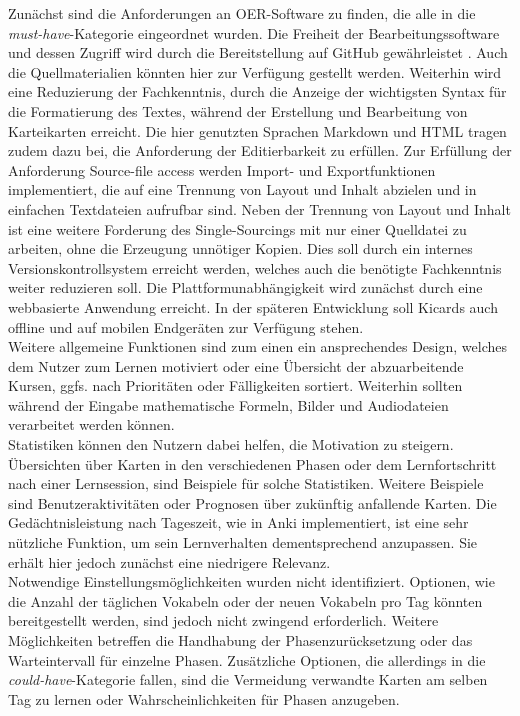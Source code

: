 \noindent Zunächst sind die Anforderungen an OER-Software zu finden, die alle in die \emph{must-have}-Kategorie eingeordnet wurden. 
Die Freiheit der Bearbeitungssoftware und dessen Zugriff wird durch die Bereitstellung auf GitHub gewährleistet \cite{kicards}. Auch die Quellmaterialien könnten hier zur Verfügung gestellt werden. 
Weiterhin wird eine Reduzierung der Fachkenntnis, durch die Anzeige der wichtigsten Syntax für die Formatierung des Textes, während der Erstellung und Bearbeitung von Karteikarten erreicht. Die hier genutzten Sprachen Markdown und HTML tragen zudem dazu bei, die Anforderung der Editierbarkeit zu erfüllen.
Zur Erfüllung der Anforderung \glqq Source-file access\grqq{} werden Import- und Exportfunktionen implementiert, die auf eine Trennung von Layout und Inhalt abzielen und in einfachen Textdateien aufrufbar sind. 
Neben der Trennung von Layout und Inhalt ist eine weitere Forderung des Single-Sourcings mit nur einer Quelldatei zu arbeiten, ohne die Erzeugung unnötiger Kopien. Dies soll durch ein internes Versionskontrollsystem erreicht werden, welches auch die benötigte Fachkenntnis weiter reduzieren soll. 
Die Plattformunabhängigkeit wird zunächst durch eine webbasierte Anwendung erreicht. In der späteren Entwicklung soll Kicards auch offline und auf mobilen Endgeräten zur Verfügung stehen. \\

\noindent Weitere allgemeine Funktionen sind zum einen ein ansprechendes Design, welches dem Nutzer zum Lernen motiviert oder eine Übersicht der abzuarbeitende Kursen, ggfs. nach Prioritäten oder Fälligkeiten sortiert. Weiterhin sollten während der Eingabe mathematische Formeln, Bilder und Audiodateien verarbeitet werden können. \\

\noindent Statistiken können den Nutzern dabei helfen, die Motivation zu steigern. Übersichten über Karten in den verschiedenen Phasen oder dem Lernfortschritt nach einer Lernsession, sind Beispiele für solche Statistiken. Weitere Beispiele sind Benutzeraktivitäten oder Prognosen über zukünftig anfallende Karten. Die Gedächtnisleistung nach Tageszeit, wie in Anki implementiert, ist eine sehr nützliche Funktion, um sein Lernverhalten dementsprechend anzupassen. Sie erhält hier jedoch zunächst eine niedrigere Relevanz. \\

\noindent Notwendige Einstellungsmöglichkeiten wurden nicht identifiziert. Optionen, wie die Anzahl der täglichen Vokabeln oder der neuen Vokabeln pro Tag könnten bereitgestellt werden, sind jedoch nicht zwingend erforderlich. Weitere Möglichkeiten betreffen die Handhabung der Phasenzurücksetzung oder das Warteintervall für einzelne Phasen. Zusätzliche Optionen, die allerdings in die \emph{could-have}-Kategorie fallen, sind die Vermeidung verwandte Karten am selben Tag zu lernen oder Wahrscheinlichkeiten für Phasen anzugeben. 

